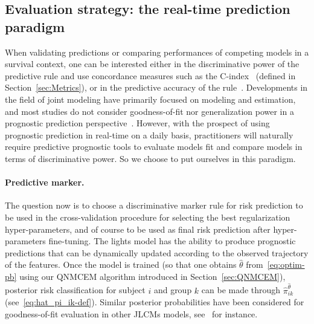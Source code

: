 \documentclass[11pt]{article}
\begin{document}
\subsection{Evaluation strategy: the real-time prediction paradigm}
\label{sec:evaluation strategy}

When validating predictions or comparing performances of competing models in a survival context, one can be interested either in the discriminative power of the predictive rule and use concordance measures such as the C-index~\citep{heagerty2005survival} (defined in Section~\ref{sec:Metrics}), or in the predictive accuracy of the rule~\citep{schemper2000predictive}.
Developments in the field of joint modeling have primarily focused on modeling and estimation, and most studies do not consider goodness-of-fit nor generalization power in a prognostic prediction perspective~\citep{hickey2016joint}. However, with the prospect of using prognostic prediction in real-time on a daily basis, practitioners will naturally require predictive prognostic tools to evaluate models fit and compare models in terms of discriminative power. So we choose to put ourselves in this paradigm.

\paragraph{Predictive marker.}

The question now is to choose a discriminative marker rule for risk prediction to be used in the cross-validation procedure for selecting the best regularization hyper-parameters, and of course to be used as final risk prediction after hyper-parameters fine-tuning.
The lights model has the ability to produce prognostic predictions that can be dynamically updated according to the observed trajectory of the features. 
Once the model is trained (so that one obtains $\hat\theta$ from~\eqref{eq:optim-pb} using our QNMCEM algorithm introduced in Section~\ref{sec:QNMCEM}), posterior risk classification for subject $i$ and group $k$ can be made through $\hat \pi_{ik}^{\hat\theta}$ (see~\eqref{eq:hat_pi_ik-def}). Similar posterior probabilities have been considered for goodness-of-fit evaluation in other JLCMs models, see~\citet{proust2014joint} for instance.
\end{document}

